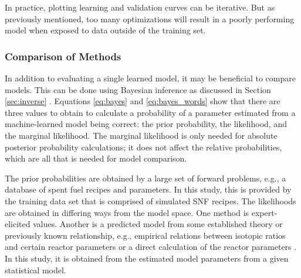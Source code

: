 In practice, plotting learning and validation curves can be iterative. But as
previously mentioned, too many optimizations will result in a poorly performing
model when exposed to data outside of the training set.

\subsubsection{Comparison of Methods}
\label{sec:invcompare}

In addition to evaluating a single learned model, it may be beneficial to
compare models. This can be done using Bayesian inference as discussed in
Section \ref{sec:inverse} \cite{inverse_theory}.  Equations \ref{eq:bayes} and
\ref{eq:bayes_words} show that there are three values to obtain to calculate a
probability of a parameter estimated from a machine-learned model being
correct: the prior probability, the likelihood, and the marginal likelihood.
The marginal likelihood is only needed for absolute posterior probability
calculations; it does not affect the relative probabilities, which are all that
is needed for model comparison.

The prior probabilities are obtained by a large set of forward problems, e.g.,
a database of spent fuel recipes and parameters. In this study, this is
provided by the training data set that is comprised of simulated \gls{SNF}
recipes. The likelihoods are obtained in differing ways from the model space.
One method is expert-elicited values. Another is a predicted model from some
established theory or previously known relationship, e.g., empirical relations
between isotopic ratios and certain reactor parameters or a direct calculation
of the reactor parameters \cite{inverse_theory}. In this study, it is obtained
from the estimated model parameters from a given statistical model. 

